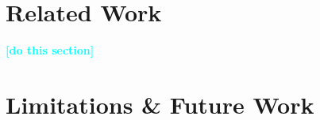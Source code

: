 \documentclass{sig-alternate-05-2015}
\newcommand{\todo}[1]{\textcolor{cyan}{\textbf{[#1]}}}
\begin{document}


%	



\section{Related Work}
\label{sec:relatedworks}

\todo{do this section}







% 



















\section{Limitations \& Future Work}
\label{sec:futurework}

%
\end{document}
